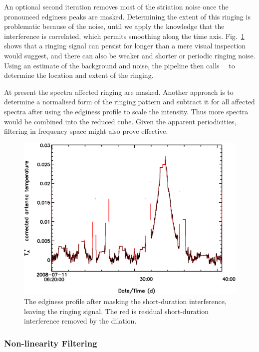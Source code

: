 \documentclass[final,authoryear,5p,times,twocolumn]{elsarticle}
\begin{document}
An optional second iteration removes most of the striation noise once
the pronounced edginess peaks are masked.  Determining the extent of
this ringing is problematic because of the noise, until we apply the
knowledge that the interference is correlated, which permits smoothing
along the time axis.
Fig.~\ref{fig:badbase:ringing_edginess_profile} shows that a ringing
signal can persist for longer than a mere visual inspection would
suggest, and there can also be weaker and shorter or periodic ringing
noise.  Using an estimate of the background and noise, the pipeline
then calls \cupid\ \findclumps\ to determine the location and extent
of the ringing.

At present the spectra affected ringing are masked.  Another approach
is to determine a normalised form of the ringing pattern and subtract
it for all affected spectra after using the edginess profile to scale
the intensity.  Thus more spectra would be combined into the reduced
cube.  Given the apparent periodicities, filtering in frequency
space might also prove effective.

\begin{figure}[t]
\includegraphics[width=\columnwidth]{ringing_edginess_profile}
\caption{The edginess profile after masking the short-duration
  interference, leaving the ringing signal.  The red is residual
  short-duration interference removed by the dilation.}
\label{fig:badbase:ringing_edginess_profile}
\end{figure}


\subsubsection{Non-linearity Filtering}
\label{sec:non-linearity}
\end{document}
